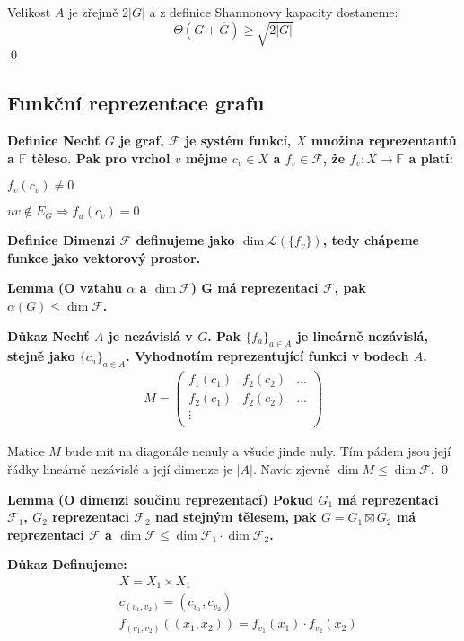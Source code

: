 \documentclass[a4paper,12pt,titlepage]{article}
\newcommand{\shn}{\Theta}
\newcommand{\lm}{\smallskip\noindent\bf Lemma\rm{} }
\newcommand{\dk}{\smallskip\noindent\bf Důkaz\rm{} }
\newcommand{\df}{\smallskip\noindent\bf Definice\rm{} }
\newcommand{\F}{\mathcal{F}}
\renewcommand{\L}{\mathcal{L}}
\newcommand{\Ft}{\mathbb{F}}
\renewcommand{\L}{\mathcal{L}}
\begin{document}
Velikost $A$ je zřejmě $2|G|$ a z definice Shannonovy kapacity dostaneme:
$$\shn(G + \overline{G}) \ge \sqrt{2|G|}$$
\qed


\subsection{Funkční reprezentace grafu}

\df Nechť $G$ je graf, $\F$ je systém funkcí, $X$ množina reprezentantů
a $\Ft$ těleso. Pak pro vrchol $v$ mějme $c_v\in X$ a $f_v \in \F$, že
$f_v: X \to \Ft$ a platí:
\begin{enumerate*}
	\item $f_v(c_v) \neq 0$
	\item $uv \notin E_G \Rightarrow f_u(c_v) = 0$
\end{enumerate*}

\df Dimenzi $\F$ definujeme jako $\dim\L(\{f_v\})$, tedy chápeme funkce
jako vektorový prostor.

\lm(O vztahu $\alpha$ a $\dim\F$) G má reprezentaci $\F$, pak $\alpha(G)
\leq \dim \F$.

\dk Nechť $A$ je nezávislá v $G$. Pak $\{f_a\}_{a\in A}$ je lineárně
nezávislá, stejně jako $\{c_a\}_{a\in A}$. Vyhodnotím reprezentující
funkci v bodech $A$.
\begin{align}
M = \left(
	\begin{matrix}
		f_1(c_1) & f_2(c_2) & \dots \\
		f_2(c_1) & f_2(c_2) & \dots \\
		\vdots &&\\
	\end{matrix}\right)
\end{align}

Matice $M$ bude mít na diagonále nenuly a všude jinde nuly. Tím pádem
jsou její řádky lineárně nezávislé a její dimenze je $|A|$. Navíc zjevně
$\dim M \le \dim\F$.
\qed


\lm(O dimenzi součinu reprezentací) Pokud $G_1$ má reprezentaci $\F_1$,
$G_2$ reprezentaci $\F_2$ nad stejným tělesem, pak $G = G_1 \boxtimes
G_2$ má reprezentaci $\F$ a $\dim\F \leq \dim\F_1 \cdot \dim\F_2$.

\dk Definujeme: 
\begin{align*}
& X = X_1 \times X_1 \\
& c_{(v_1,v_2)} = (c_{v_1}, c_{v_2}) \\
& f_{(v_1, v_2)}((x_1,x_2)) = f_{v_1}(x_1) \cdot f_{v_2}(x_2)
\end{align*}
\end{document}
